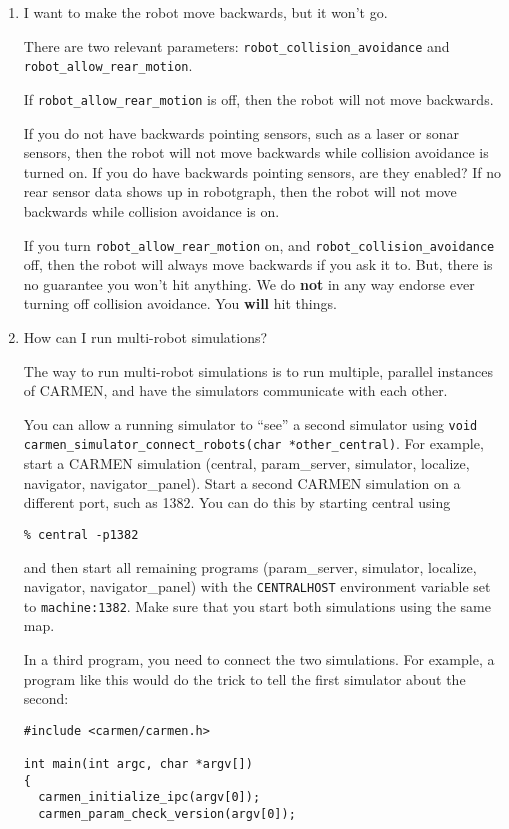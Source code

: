 \documentclass{article}
\begin{document}
\begin{enumerate}
\item I want to make the robot move backwards, but it won't go.  

  There are two relevant parameters: \verb!robot_collision_avoidance! and
  \verb!robot_allow_rear_motion!.  
  
  If \verb!robot_allow_rear_motion! is off, then the robot will not move
  backwards.

  If you do not have backwards pointing sensors, such as a laser or sonar
  sensors, then the robot will not move backwards while collision avoidance is
  turned on. If you do have backwards pointing sensors, are they enabled? If
  no rear sensor data shows up in robotgraph, then the robot will not move
  backwards while collision avoidance is on.
  
  If you turn \verb!robot_allow_rear_motion! on, and
  \verb!robot_collision_avoidance! off, then the robot will always move
  backwards if you ask it to. But, there is no guarantee you won't hit
  anything. We do {\bf not} in any way endorse ever turning off collision
  avoidance. You {\bf will} hit things.

\item How can I run multi-robot simulations?

The way to run multi-robot simulations is to run multiple, parallel instances
of CARMEN, and have the simulators communicate with each other. 

You can allow a running simulator to ``see'' a second simulator using
\verb!void carmen_simulator_connect_robots(char *other_central)!. For example,
start a CARMEN simulation (central, param\_server, simulator, localize,
navigator, navigator\_panel). Start a second CARMEN simulation on a different
port, such as 1382. You can do this by starting central using
\begin{verbatim}
% central -p1382
\end{verbatim}
and then start all remaining programs (param\_server, simulator, localize,
navigator, navigator\_panel) with the \verb!CENTRALHOST! environment variable
set to \verb!machine:1382!. Make sure that you start both simulations using
the same map. 

In a third program, you need to connect the two simulations. For example, a
program like this would do the trick to tell the first simulator about the
second:

\begin{verbatim}
#include <carmen/carmen.h>

int main(int argc, char *argv[]) 
{
  carmen_initialize_ipc(argv[0]);
  carmen_param_check_version(argv[0]);


\end{verbatim}
\end{enumerate}
\end{document}
